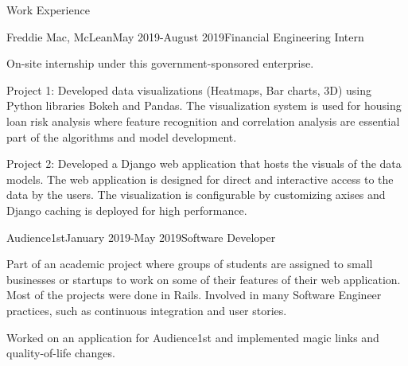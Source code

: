 \documentclass{resume} %
\begin{document}

\begin{rSection}{Work Experience}

\begin{rSubsection}{Freddie Mac, McLean}{May 2019-August 2019}{Financial Engineering Intern}{} 
    \item On-site internship under this government-sponsored enterprise.
    \item Project 1: Developed data visualizations (Heatmaps, Bar charts, 3D) using Python libraries Bokeh and Pandas. The visualization system is used for housing loan risk analysis where feature recognition and correlation analysis are essential part of the algorithms and model development.
    \item Project 2: Developed a Django web application that hosts the visuals of the data models. The web application is designed for direct and interactive access to the data by the users. The visualization is configurable by customizing axises and Django caching is deployed for high performance.
\end{rSubsection}

\begin{rSubsection}{Audience1st}{January 2019-May 2019}{Software Developer}{}
    \item Part of an academic project where groups of students are assigned to small businesses or startups to work on some of their features of their web application. Most of the projects were done in Rails. Involved in many Software Engineer practices, such as continuous integration and user stories.
    \item Worked on an application for Audience1st and implemented magic links and quality-of-life changes.
\end{rSubsection}

\end{rSection}

\newpage
\end{document}
